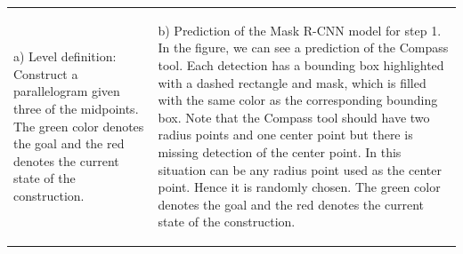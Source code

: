 \begin{longtable}{p{7.25cm}p{7.25cm}}
\begin{small}a) Level definition: Construct a parallelogram given three of the midpoints. The green color denotes the goal and the red denotes the current state of the construction.\end{small}
& 
\begin{small}
b) Prediction of the Mask {R-CNN} model for step 1. In the figure, we can see a prediction of the Compass tool. Each detection has a bounding box highlighted with a dashed rectangle and mask, which is filled with the same color as the corresponding bounding box. Note that the Compass tool should have two radius points and one center point but there is missing detection of the center point. In this situation can be any radius point used as the center point. Hence it is randomly chosen. The green color denotes the goal and the red denotes the current state of the construction. \end{small}
\\
 


\end{longtable}
